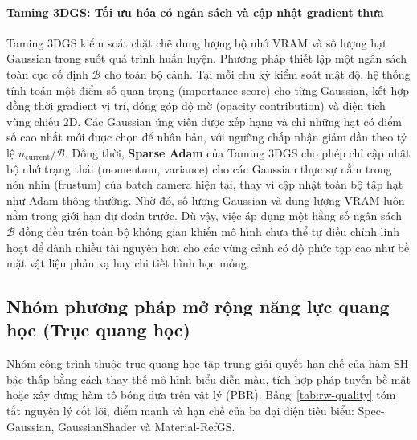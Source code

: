 \paragraph{Taming 3DGS: Tối ưu hóa có ngân sách và cập nhật gradient thưa}
\label{para:taming3dgs-detail}
Taming 3DGS \cite{mallick2024taming} kiểm soát chặt chẽ dung lượng bộ nhớ VRAM và số lượng hạt Gaussian trong suốt quá trình huấn luyện. Phương pháp thiết lập một ngân sách toàn cục cố định $\mathcal{B}$ cho toàn bộ cảnh. Tại mỗi chu kỳ kiểm soát mật độ, hệ thống tính toán một điểm số quan trọng (importance score) cho từng Gaussian, kết hợp đồng thời gradient vị trí, đóng góp độ mờ (opacity contribution) và diện tích vùng chiếu 2D. Các Gaussian ứng viên được xếp hạng và chỉ những hạt có điểm số cao nhất mới được chọn để nhân bản, với ngưỡng chấp nhận giảm dần theo tỷ lệ $n_{\text{current}}/\mathcal{B}$. Đồng thời, \textbf{Sparse Adam} của Taming 3DGS cho phép chỉ cập nhật bộ nhớ trạng thái (momentum, variance) cho các Gaussian thực sự nằm trong nón nhìn (frustum) của batch camera hiện tại, thay vì cập nhật toàn bộ tập hạt như Adam thông thường. Nhờ đó, số lượng Gaussian và dung lượng VRAM luôn nằm trong giới hạn dự đoán trước. Dù vậy, việc áp dụng một hằng số ngân sách $\mathcal{B}$ đồng đều trên toàn bộ không gian khiến mô hình chưa thể tự điều chỉnh linh hoạt để dành nhiều tài nguyên hơn cho các vùng cảnh có độ phức tạp cao như bề mặt vật liệu phản xạ hay chi tiết hình học mỏng.

\subsection{Nhóm phương pháp mở rộng năng lực quang học (Trục quang học)}
\label{subsec:rw-optics}

Nhóm công trình thuộc trục quang học tập trung giải quyết hạn chế của hàm SH bậc thấp bằng cách thay thế mô hình biểu diễn màu, tích hợp pháp tuyến bề mặt hoặc xây dựng hàm tô bóng dựa trên vật lý (PBR). Bảng~\ref{tab:rw-quality} tóm tắt nguyên lý cốt lõi, điểm mạnh và hạn chế của ba đại diện tiêu biểu: Spec-Gaussian, GaussianShader và Material-RefGS.

\begingroup
\small
\renewcommand{\arraystretch}{1.35}
\setlength{\tabcolsep}{5pt}

